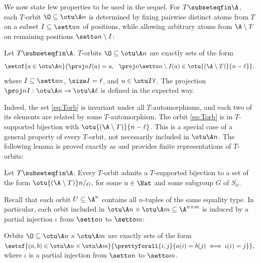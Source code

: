 We now state few properties to be used in the sequel.
For $T\subseteqfin\A$,
each $T$-orbit $\O\subseteq \otu \A n$ is determined by fixing pairwise distinct atoms
from $T$ on a subset $I\subseteq \setto n$ of positions, while allowing arbitrary atoms from $\A\setminus T$ on
remaining positions $\setto n\setminus I$:
%
\begin{lemma} \label{lem:tupleorbit}
Let $T\subseteqfin \A$.
$T$-orbits $\O\subseteq \otu \A n$ are exactly sets of the form
%
\begin{align} \label{eq:Torb}
\begin{aligned}
\setof{a \in \otu \A n}{\proj n I(a) = u, \ \ \proj n {\setto n \setminus I} (a) \in \otu {(\A\setminus T)} {n-\ell}},
\end{aligned}
\end{align}
%
where $I \subseteq \setto n$, $\size I = \ell$, and $u\in\otu T \ell$.
The projection $\proj n I : \otu \A n \to \otu \A \ell$ is defined in the expected way.
\end{lemma}
%
Indeed, the set \eqref{eq:Torb} is invariant under all $T$-automorphisms,
and each two of its elements
are related by some $T$-automorphism.
%
%
%
The orbit \eqref{eq:Torb} is in $T$-supported bijection with $\otu {(\A\setminus T)} {n-\ell}$.
This is a special case of a general property of
every $T$-orbit, not necessarily included in $\otu \A n$.
The following lemma is proved exactly as \cite[Theorem 6.3]{atombook}
and provides finite representations of $T$-orbits:
%
\begin{lemma}\label{lem:repn}
Let $T \subseteqfin \A$.
Every $T$-orbit admits a $T$-supported bijection to a set of the form 
$
\otu {(\A \setminus T)} n/_G,
$
for some $n \in \Nat$ and some subgroup $G$ of $S_n$.
\end{lemma}
%


Recall that each orbit $U\subseteq \A^n$ contains all $n$-tuples of the same equality type.
In particular,  each orbit included in $\otu \A n \times \otu \A m \subseteq \A^{n+m}$
is induced by a partial injection $\iota$ from $\setto n$ to $\setto m$:
%
\begin{lemma} \label{lem:orbitpair}
Orbits $\O\subseteq \otu \A n \times \otu \A m$
are exactly sets of the form
$
\setof{ (a, b) \in \otu \A n \times \otu \A m
}{\prettyforall{i,j}{a(i) = b(j) \iff \iota(i) = j}},
$
where $\iota$ is a partial injection from $\setto n$ to $\setto m$.
\end{lemma}
%
%

